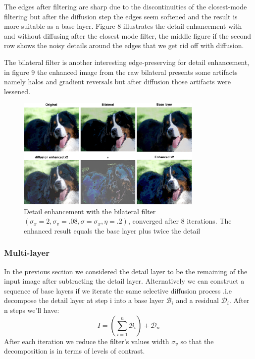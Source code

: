 \documentclass{acmsiggraph}
\begin{document}
The edges after filtering are sharp due to the discontinuities of the closest-mode filtering but after the diffusion step the edges seem softened and the result is more suitable as a base layer. Figure 8 illustrates the detail enhancement with and without diffusing after the closest mode filter, the middle figure if the second row shows the noisy details around the edges that we get rid off with diffusion.  

The bilateral filter is another interesting edge-preserving for detail enhancement, in figure 9 the enhanced image from the raw bilateral presents some artifacts namely halos and gradient reversals but after diffusion those artifacts were lessened.
\begin{figure}
\centering
\includegraphics[width=9cm]{dog}
\caption{Detail enhancement with the bilateral filter \\$(\sigma_x=2,\sigma_v=.08,\sigma=\sigma_x,\eta=.2)$, converged after 8 iterations. The enhanced result equals the base layer plus twice the detail}
\end{figure}
\subsubsection{Multi-layer}
In the previous section we considered the detail layer to be the remaining of the input image after subtracting the detail layer. Alternatively we can construct a sequence of base layers if we iterate the same selective diffusion process .i.e decompose the detail layer at step i into a base layer $\mathcal B_i$ and a residual $\mathcal D_i$. After n steps we'll have:
\begin{equation}
I = \left(\sum\limits_{i=1}^n\mathcal B_i\right) + \mathcal D_n
\end{equation}
After each iteration we reduce the filter's values width $\sigma_v$ so that the decomposition is in terms of levels of contrast.
\end{document}
